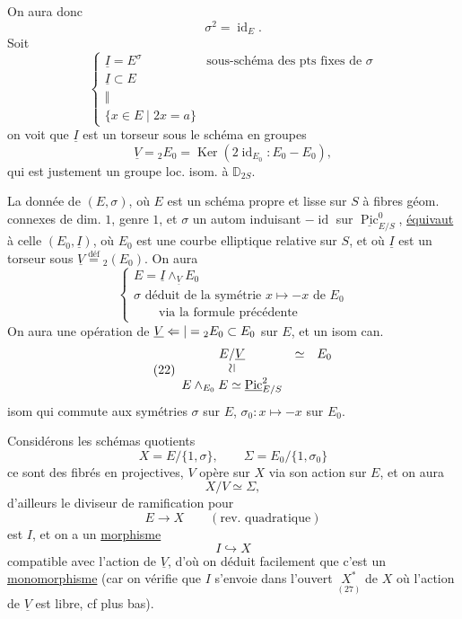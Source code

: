 On aura donc
\[
\sigma^2=\operatorname{id}_E.
\]
Soit 
\[
\tag{19}\left\{\begin{array}{ll}
\underline I=E^\sigma&\text{sous-schéma des pts fixes de }\sigma\\
\underline I\subset E&\\[-4pt]
\Vert&\\[-4pt]
\{x\in E\mid 2x=a\}&
\end{array}\right.
\]
on voit que $\underline I$ est un torseur sous le schéma en groupes
\[
\tag{20}\underline V={}_2E_0=\operatorname{Ker}(2\operatorname{id}_{E_0}:E_0-E_0),
\]
qui est justement un groupe  loc. isom. à $\mathbb D_{2S}$.

La donnée de $(E,\sigma)$, où $E$ est un schéma
propre et lisse sur $S$ à fibres géom. connexes de dim. $1$, genre $1$, et $\sigma$ un autom induisant $-\operatorname{id}$ sur $\underline{\operatorname{Pic}}^0_{E/S}$, \uline{équivaut} à celle   $(E_0,\underline I)$, où $E_0$ est une courbe elliptique relative sur $S$, et où $\underline I$ est un torseur sous  $\underline V\overset{\mathrm{déf}}={}_2(E_0)$. On aura
\[
\tag{21}\left\{\begin{array}{l}
E=\underline I\wedge_{\underline V}E_0\\
\sigma\text{ déduit de la symétrie }x\mapsto-x\text{ de }E_0\\
\qquad\text{via la formule précédente}
\end{array}\right.
\]
On aura une opération de $\underline V\Leftarrow|={}_2E_0\subset E_0$ sur $E$, et un isom can.
\[
\tag{22}\begin{array}{ccc}
E/\underline V&\simeq&E_0\\
\rotatebox{90}{$\simeq$}&&\\
E\wedge_{E_0}E\simeq\underline{\operatorname{Pic}}^2_{E/S}&&
\end{array}
\]
isom qui commute aux symétries $\sigma$ sur $E$, $\sigma_0:x\mapsto-x$ sur $E_0$.

Considérons les schémas quotients
\[
\tag{23}X=E/\{1,\sigma\},\qquad\Sigma=E_0/\{1,\sigma_0\}
\]
ce sont des fibrés en   projectives,
 $V$ opère  sur $X$  via son  action sur $E$, et on aura
\[
\tag{24}X/V\simeq\Sigma,
\]
d'ailleurs le diviseur de ramification pour
\[
\tag{25}E\longrightarrow X\qquad(\text{rev. quadratique})
\]
est $I$, et on a un \uline{morphisme}
\[
\tag{26}I\hookrightarrow X
\]
compatible avec l'action de $\underline V$, d'où on déduit facilement que c'est un \uline{monomorphisme} (car on vérifie que $I$ s'envoie dans l'ouvert $\underset{(27)}{X^*}$ de $X$ où l'action de $\underline V$ est libre, cf plus bas).

